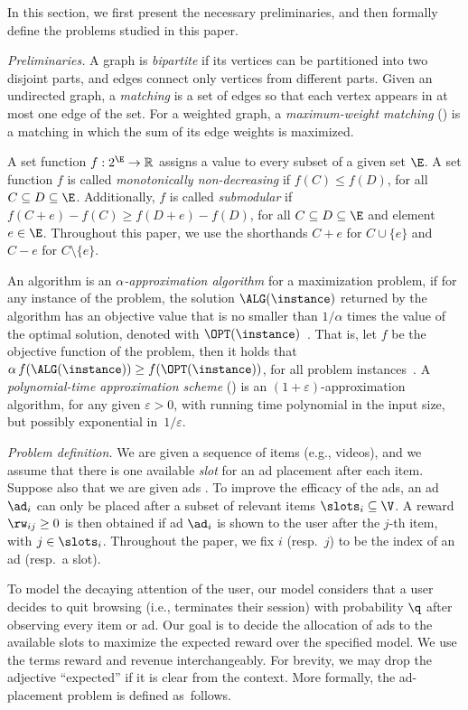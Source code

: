 In this section, we first present the necessary preliminaries, and then formally define the problems 
studied in this paper.

\smallskip
\noindent
\emph{Preliminaries.}
A graph is \emph{bipartite} if its vertices can be partitioned into two disjoint parts, and
edges connect only vertices from different parts. 
Given an undirected graph, a \emph{matching} is a set of edges so that each vertex appears in at most one edge of the set.
For a weighted graph, a \emph{maximum-weight matching} (\mwm) is a matching in which the sum of its edge weights is maximized.

A set function $f: 2^\E \to \mathbb{R}$ %
assigns a value to every subset of a given set $\E$.
A set function $f$ is called \emph{monotonically non-decreasing} if $f(C) \le f(D)$,
for all $C \subseteq D \subseteq \E$.
Additionally, $f$ is called \emph{submodular} if $f(C + e) - f(C) \ge f(D + e) - f(D)$, 
for all $C \subseteq D \subseteq \E$ and element $e \in \E$.
Throughout this paper, we use the shorthands $C + e$ for $C \cup \{e\}$ and $C - e$ for $C \setminus \{e\}$.

An algorithm \ALG is an \emph{$\alpha$-approximation algorithm} for a maximization problem,  
if for any instance \instance of the problem, 
the solution $\ALG(\instance)$ returned by the algorithm
has an objective value that is no smaller than $1/\alpha$ 
times the value of the optimal solution, denoted with $\OPT(\instance)$~\citep{williamson2011design}.
That is, let $f$ be the objective function of the problem,
then it holds that $\alpha\, f(\ALG(\instance)) \ge f(\OPT(\instance))$, for all problem instances~\instance. 
A \emph{polynomial-time approximation scheme} (\PTAS) 
is an $(1+\varepsilon)$-approximation algorithm, for any given $\varepsilon > 0$,
with running time polynomial in the input size, but possibly exponential in~$1/\varepsilon$.


\smallskip
\noindent
\emph{Problem definition.}
We are given a sequence of \nV items (e.g., videos), 
and we assume that there is 
one available \emph{slot} for an ad placement after each item.
Suppose also that we are given \nads ads \ads. 
To improve the efficacy of the ads,
an ad $\ad_i$ can only be placed after a subset of relevant items $\slots_i \subseteq \V$.
A reward $\rw_{ij} \ge 0$ is then %
obtained if ad $\ad_i$ is shown to the user after the $j$-th item, with $j \in \slots_i$.
Throughout the paper, we fix $i$ (resp.~$j$) to be the index of an ad (resp.~a slot).

To model the decaying attention of the user, 
our model considers %
that a user decides to quit browsing (i.e., terminates their session) 
with probability $\q$ after observing every item or ad.
Our goal is to decide the allocation of ads to the available slots 
to maximize the expected reward over the specified model. 
We use the terms reward and revenue interchangeably.
For brevity, we may drop the adjective ``expected'' if it is clear from the context.
More formally, the ad-placement problem is defined as~follows.

